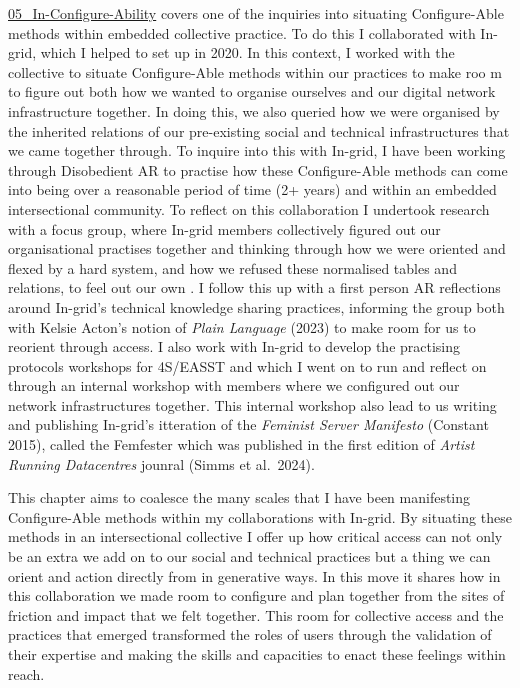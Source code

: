 \href{../../05_In-Configure-Ability/05_In-Configure-Ability.md}{05\_In-Configure-Ability}
covers one of the inquiries into situating Configure-Able methods within
embedded collective practice. To do this I collaborated with In-grid,
which I helped to set up in 2020. In this context, I worked with the
collective to situate Configure-Able methods within our practices to
make roo m to figure out both how we wanted to organise ourselves and
our digital network infrastructure together. In doing this, we also
queried how we were organised by the inherited relations of our
pre-existing social and technical infrastructures that we came together
through. To inquire into this with In-grid, I have been working through
Disobedient AR to practise how these Configure-Able methods can come
into being over a reasonable period of time (2+ years) and within an
embedded intersectional community. To reflect on this collaboration I
undertook research with a focus group, where In-grid members
collectively figured out our organisational practises together and
thinking through how we were oriented and flexed by a hard system, and
how we refused these normalised tables and relations, to feel out our
own . I follow this up with a first person AR reflections around
In-grid's technical knowledge sharing practices, informing the group
both with Kelsie Acton's notion of \emph{Plain Language} (2023) to make
room for us to reorient through access. I also work with In-grid to
develop the practising protocols workshops for 4S/EASST and which I went
on to run and reflect on through an internal workshop with members where
we configured out our network infrastructures together. This internal
workshop also lead to us writing and publishing In-grid's itteration of
the \emph{Feminist Server Manifesto} (Constant 2015), called the
Femfester which was published in the first edition of \emph{Artist
Running Datacentres} jounral (Simms et al.~2024).

This chapter aims to coalesce the many scales that I have been
manifesting Configure-Able methods within my collaborations with
In-grid. By situating these methods in an intersectional collective I
offer up how critical access can not only be an extra we add on to our
social and technical practices but a thing we can orient and action
directly from in generative ways. In this move it shares how in this
collaboration we made room to configure and plan together from the sites
of friction and impact that we felt together. This room for collective
access and the practices that emerged transformed the roles of users
through the validation of their expertise and making the skills and
capacities to enact these feelings within reach.

